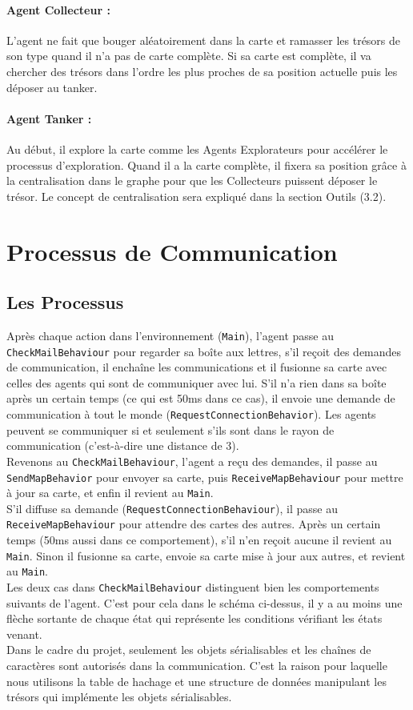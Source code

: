 \documentclass[10pt]{article}
\newcommand\tab[1][0.65cm]{\hspace*{#1}}
\begin{document}
\paragraph{Agent Collecteur :} L'agent ne fait que bouger aléatoirement dans la carte et ramasser les trésors de son type quand il n'a pas de carte complète. Si sa carte est complète, il va chercher des trésors dans l'ordre les plus proches de sa position actuelle puis les déposer au tanker.

\paragraph{Agent Tanker :} Au début, il explore la carte comme les Agents Explorateurs pour accélérer le processus d'exploration. Quand il a la carte complète, il fixera sa position grâce à la centralisation dans le graphe pour que les Collecteurs puissent déposer le trésor. Le concept de centralisation sera expliqué dans la section Outils (3.2).

\section{Processus de Communication}

\subsection{Les Processus}
Après chaque action dans l'environnement (\texttt{Main}), l'agent passe au \texttt{CheckMailBehaviour} pour regarder sa boîte aux lettres, s'il reçoit des demandes de communication, il enchaîne les communications et il fusionne sa carte avec celles des agents qui sont 
 de communiquer avec lui. S'il n'a rien dans sa boîte après un certain temps (ce qui est 50ms dans ce cas), il envoie une demande de communication à tout le monde (\texttt{RequestConnectionBehavior}). Les agents peuvent se communiquer si et seulement s'ils sont dans le rayon de communication (c'est-à-dire une distance de 3).\\
\tab Revenons au \texttt{CheckMailBehaviour}, l'agent a reçu des demandes, il passe au \texttt{SendMapBehavior} pour envoyer sa carte, puis \texttt{ReceiveMapBehaviour} pour mettre à jour sa carte, et enfin il revient au \texttt{Main}.\\
\tab S'il diffuse sa demande (\texttt{RequestConnectionBehaviour}), il passe au \texttt{ReceiveMapBehaviour} pour attendre des cartes des autres. Après un certain temps (50ms aussi dans ce comportement), s'il n'en reçoit aucune il revient au \texttt{Main}. Sinon il fusionne sa carte, envoie sa carte mise à jour aux autres, et revient au \texttt{Main}.\\
\tab Les deux cas dans \texttt{CheckMailBehaviour} distinguent bien les comportements suivants de l'agent. C'est pour cela dans le schéma ci-dessus, il y a au moins une flèche sortante de chaque état qui représente les conditions vérifiant les états venant.\\
\tab Dans le cadre du projet, seulement les objets sérialisables et les chaînes de caractères sont autorisés dans la communication. C'est la raison pour laquelle nous utilisons la table de hachage et une structure de données manipulant les trésors qui implémente les objets sérialisables.
\end{document}
